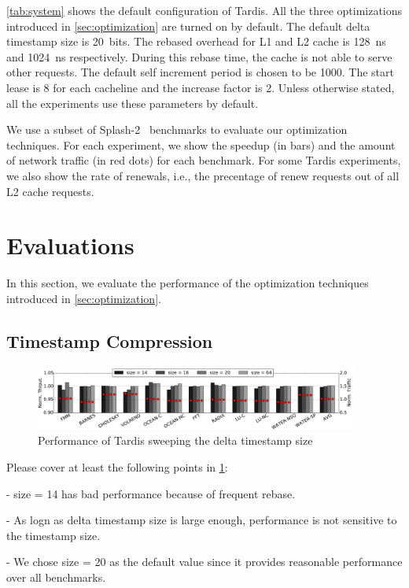 \documentclass[12pt]{article}
\begin{document}
\cref{tab:system} shows the default configuration of Tardis. All the 
three optimizations introduced in \cref{sec:optimization} are turned 
on by default. The default delta timestamp size is 20~bits. The 
rebased overhead for L1 and L2 cache is 128~ns and 1024~ns 
respectively. During this rebase time, the cache is not able to serve 
other requests. The default self increment period is chosen to be 
1000. The start lease is 8 for each cacheline and the increase factor 
is 2. Unless otherwise stated, all the experiments use these 
parameters by default.

We use a subset of Splash-2~\cite{splash2} benchmarks to evaluate our 
optimization techniques. For each experiment, we show the speedup (in 
bars) and the amount of network traffic (in red dots) for each 
benchmark. For some Tardis experiments, we also show the rate of 
renewals, i.e., the precentage of renew requests out of all L2 cache 
requests.     

\section{Evaluations}

In this section, we evaluate the performance of the optimization 
techniques introduced in \cref{sec:optimization}.

\subsection{Timestamp Compression}

\begin{figure}
	\centering
	\includegraphics[width=0.95\textwidth]{figs/tssize.pdf}
	\caption{ Performance of Tardis sweeping the delta timestamp size}
	\label{fig:tssize}
\end{figure}

Please cover at least the following points in \cref{fig:tssize}:

- size = 14 has bad performance because of frequent rebase.

- As logn as delta timestamp size is large enough, performance is not 
  sensitive to the timestamp size.

- We chose size = 20 as the default value since it provides reasonable 
  performance over all benchmarks.
\end{document}
